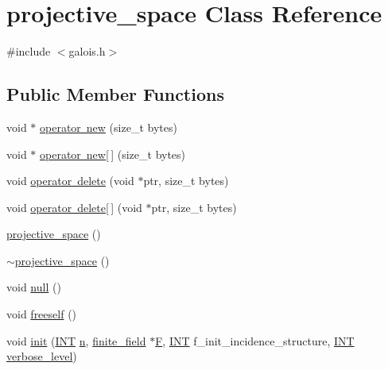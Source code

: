 \hypertarget{classprojective__space}{}\section{projective\+\_\+space Class Reference}
\label{classprojective__space}


{\ttfamily \#include $<$galois.\+h$>$}

\subsection*{Public Member Functions}
\begin{DoxyCompactItemize}
\item 
void $\ast$ \mbox{\hyperlink{classprojective__space_a6a556a26a50498705956caad572ed94a}{operator new}} (size\+\_\+t bytes)
\item 
void $\ast$ \mbox{\hyperlink{classprojective__space_a6e04ae556be0ec6d0fea84e7453a1607}{operator new\mbox{[}$\,$\mbox{]}}} (size\+\_\+t bytes)
\item 
void \mbox{\hyperlink{classprojective__space_a0a28ea31df3e389ad094400573d89b9c}{operator delete}} (void $\ast$ptr, size\+\_\+t bytes)
\item 
void \mbox{\hyperlink{classprojective__space_ab967c3597c91ed70cd9b3d44fab45c7c}{operator delete\mbox{[}$\,$\mbox{]}}} (void $\ast$ptr, size\+\_\+t bytes)
\item 
\mbox{\hyperlink{classprojective__space_afc915202d40e4ee5ed3ace7412c5de09}{projective\+\_\+space}} ()
\item 
\mbox{\hyperlink{classprojective__space_acd0bc9e42e979091ca31bd9b98cccf3c}{$\sim$projective\+\_\+space}} ()
\item 
void \mbox{\hyperlink{classprojective__space_a62345678b9dd4294a070135065bccf58}{null}} ()
\item 
void \mbox{\hyperlink{classprojective__space_af08838fa7ca54726d791a8333af0a293}{freeself}} ()
\item 
void \mbox{\hyperlink{classprojective__space_a8a1efa40df92744519365f82e4740dab}{init}} (\mbox{\hyperlink{galois_8h_a09fddde158a3a20bd2dcadb609de11dc}{I\+NT}} \mbox{\hyperlink{classprojective__space_abe307ea9427f119c2f054d85196e9655}{n}}, \mbox{\hyperlink{classfinite__field}{finite\+\_\+field}} $\ast$\mbox{\hyperlink{classprojective__space_ab635000d4ce6ba131855377e4dce177d}{F}}, \mbox{\hyperlink{galois_8h_a09fddde158a3a20bd2dcadb609de11dc}{I\+NT}} f\+\_\+init\+\_\+incidence\+\_\+structure, \mbox{\hyperlink{galois_8h_a09fddde158a3a20bd2dcadb609de11dc}{I\+NT}} \mbox{\hyperlink{simeon_8_c_a818073fbcc2f439e7c56952f67386122}{verbose\+\_\+level}})

\end{DoxyCompactItemize}
